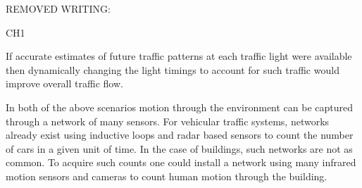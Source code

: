 REMOVED WRITING:

CH1

If accurate estimates of future traffic patterns at each traffic light were available then dynamically changing the light timings to account for such traffic would improve overall traffic flow.

In both of the above scenarios motion through the environment can be captured through a network of many sensors.  For vehicular traffic systems, networks already exist using inductive loops and radar based sensors to count the number of cars in a given unit of time.  In the case of buildings, such networks are not as common.  To acquire such counts one could install a network using many infrared motion sensors and cameras to count human motion through the building.  